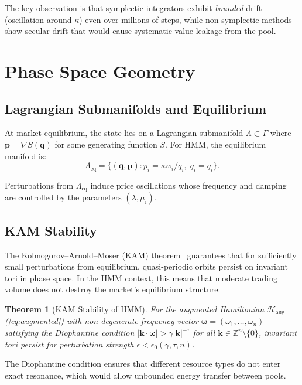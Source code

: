 \documentclass[11pt,twocolumn]{article}
\newtheorem{theorem}{Theorem}
\begin{document}
The key observation is that symplectic integrators exhibit \emph{bounded} drift (oscillation around $\kappa$) even over millions of steps, while non-symplectic methods show secular drift that would cause systematic value leakage from the pool.

\section{Phase Space Geometry}
\label{sec:geometry}

\subsection{Lagrangian Submanifolds and Equilibrium}

At market equilibrium, the state lies on a Lagrangian submanifold $\Lambda \subset \Gamma$ where $\bm{p} = \nabla S(\bm{q})$ for some generating function $S$. For HMM, the equilibrium manifold is:
\begin{equation}
\Lambda_{\text{eq}} = \{(\bm{q}, \bm{p}) : p_i = \kappa w_i / q_i, \; q_i = \bar{q}_i\}.
\end{equation}

Perturbations from $\Lambda_{\text{eq}}$ induce price oscillations whose frequency and damping are controlled by the parameters $(\lambda, \mu_i)$.

\subsection{KAM Stability}

The Kolmogorov--Arnold--Moser (KAM) theorem~\cite{arnold1963proof} guarantees that for sufficiently small perturbations from equilibrium, quasi-periodic orbits persist on invariant tori in phase space. In the HMM context, this means that moderate trading volume does not destroy the market's equilibrium structure.

\begin{theorem}[KAM Stability of HMM]
For the augmented Hamiltonian $\mathcal{H}_{\text{aug}}$ (\ref{eq:augmented}) with non-degenerate frequency vector $\bm{\omega} = (\omega_1, \ldots, \omega_n)$ satisfying the Diophantine condition $|\bm{k} \cdot \bm{\omega}| > \gamma |\bm{k}|^{-\tau}$ for all $\bm{k} \in \mathbb{Z}^n \setminus \{0\}$, invariant tori persist for perturbation strength $\epsilon < \epsilon_0(\gamma, \tau, n)$.
\end{theorem}

The Diophantine condition ensures that different resource types do not enter exact resonance, which would allow unbounded energy transfer between pools.
\end{document}
